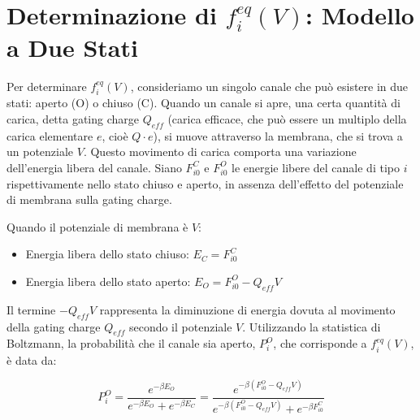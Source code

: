 \vspace{0.5cm}
\noindent{}
\vspace{0.5cm}


\section{Determinazione di $f_i^{eq}(V)$: Modello a Due Stati}
Per determinare $f_i^{eq}(V)$, consideriamo un singolo canale che può esistere in due stati: aperto (O) o chiuso (C).
Quando un canale si apre, una certa quantità di carica, detta gating charge $Q_{eff}$ (carica efficace, che può essere un multiplo della carica elementare $e$, cioè $Q \cdot e$), si muove attraverso la membrana, che si trova a un potenziale $V$. Questo movimento di carica comporta una variazione dell'energia libera del canale.
Siano $F_{i0}^C$ e $F_{i0}^O$ le energie libere del canale di tipo $i$ rispettivamente nello stato chiuso e aperto, in assenza dell'effetto del potenziale di membrana sulla gating charge.

Quando il potenziale di membrana è $V$:
\begin{itemize}
    \item Energia libera dello stato chiuso: $E_C = F_{i0}^C$
    \item Energia libera dello stato aperto: $E_O = F_{i0}^O - Q_{eff}V$
\end{itemize}

Il termine $-Q_{eff}V$ rappresenta la diminuzione di energia dovuta al movimento della gating charge $Q_{eff}$ secondo il potenziale $V$.
Utilizzando la statistica di Boltzmann, la probabilità che il canale sia aperto, $P_i^O$, che corrisponde a $f_i^{eq}(V)$, è data da:

\begin{equation} \label{eq:ch20_6}
P_i^O = \frac{e^{-\beta E_O}}{e^{-\beta E_O} + e^{-\beta E_C}} = \frac{e^{-\beta (F_{i0}^O - Q_{eff}V)}}{e^{-\beta (F_{i0}^O - Q_{eff}V)} + e^{-\beta F_{i0}^C}}
\end{equation}

